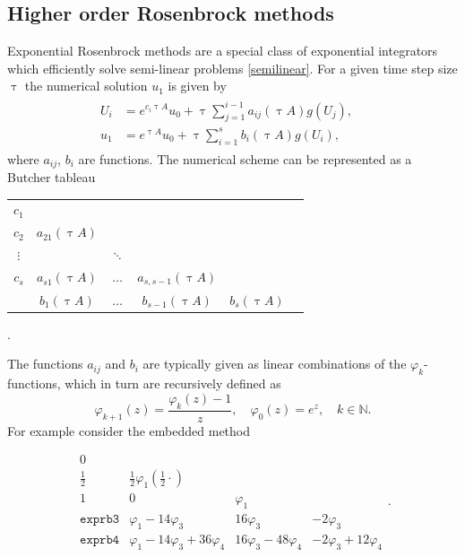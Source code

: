 \documentclass{scrartcl}
\begin{document}
\subsection{Higher order Rosenbrock methods}
Exponential Rosenbrock methods are a special class of exponential integrators which efficiently solve semi-linear problems \ref{semilinear}. For a given time step size $\uptau$ the numerical solution $u_1$ is given by
\begin{align}
\begin{split}
U_{i} &= e^{c_i \uptau A}u_0 + \uptau\sum_{j=1}^{i-1}a_{ij}(\uptau A)g(U_{j}), \quad \\
u_{1} &= e^{    \uptau A}u_0 + \uptau\sum_{i=1}^{s}b_i(\uptau A)g(U_{i}),
\end{split}\label{exprbscheme}
\end{align}
where $a_{ij}$, $b_{i}$ are functions. The numerical scheme can be represented as a Butcher tableau
\begin{table}[H]
	\centering
	\begin{tabular}{c|ccccc}
		$c_1$ &  &  &  & \\
		$c_2$ & $a_{21}(\uptau A)$ &  &  & \\
		$\vdots$ & &  $\ddots$  &  & \\
		$c_s$ & $a_{s1}(\uptau A)$ & $\ldots$ & $a_{s,s-1}(\uptau A)$  & \\
		\hline
		&$b_1(\uptau A)$ & $\ldots$ & $b_{s-1}(\uptau A)$ & $b_s(\uptau A)$
	\end{tabular}
	.
\end{table} \noindent The functions $a_{ij}$ and $b_{i}$ are typically given as linear combinations of the $\varphi_k$-functions, which in turn are recursively defined as 
\[\varphi_{k+1}(z) = \frac{\varphi_k(z)-1}z, \quad \varphi_0(z) = e^z, \quad k\in\mathbb{N}.\]
For example consider the embedded method
\begin{table}[H]
	\centering
	\[
	\renewcommand\arraystretch{1.2}
	\begin{array}
	{c|ccc}
	0\\
	\frac{1}{2} & \frac{1}{2}\varphi_1(\frac{1}{2}\cdot)\\
	1& 0& \varphi_1\\
	\hline
	\texttt{exprb3} & \varphi_1 - 14\varphi_3 & 16\varphi_3 & -2\varphi_3  \\
	\texttt{exprb4} & \varphi_1 - 14\varphi_3 + 36\varphi_4 & 16\varphi_3 -48\varphi_4 & -2\varphi_3 + 12\varphi_4  
	\end{array}.
	\]
\end{table}
\end{document}
